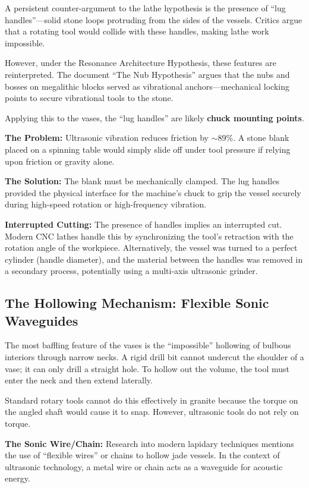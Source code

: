 \documentclass[11pt]{article}
\begin{document}
A persistent counter-argument to the lathe hypothesis is the presence of ``lug handles''---solid stone loops protruding from the sides of the vessels. Critics argue that a rotating tool would collide with these handles, making lathe work impossible.

However, under the Resonance Architecture Hypothesis, these features are reinterpreted. The document ``The Nub Hypothesis'' argues that the nubs and bosses on megalithic blocks served as vibrational anchors---mechanical locking points to secure vibrational tools to the stone.

Applying this to the vases, the ``lug handles'' are likely \textbf{chuck mounting points}.

\textbf{The Problem:} Ultrasonic vibration reduces friction by $\sim$89\%. A stone blank placed on a spinning table would simply slide off under tool pressure if relying upon friction or gravity alone.

\textbf{The Solution:} The blank must be mechanically clamped. The lug handles provided the physical interface for the machine's chuck to grip the vessel securely during high-speed rotation or high-frequency vibration.

\textbf{Interrupted Cutting:} The presence of handles implies an interrupted cut. Modern CNC lathes handle this by synchronizing the tool's retraction with the rotation angle of the workpiece. Alternatively, the vessel was turned to a perfect cylinder (handle diameter), and the material between the handles was removed in a secondary process, potentially using a multi-axis ultrasonic grinder.

\subsection{The Hollowing Mechanism: Flexible Sonic Waveguides}

The most baffling feature of the vases is the ``impossible'' hollowing of bulbous interiors through narrow necks. A rigid drill bit cannot undercut the shoulder of a vase; it can only drill a straight hole. To hollow out the volume, the tool must enter the neck and then extend laterally.

Standard rotary tools cannot do this effectively in granite because the torque on the angled shaft would cause it to snap. However, ultrasonic tools do not rely on torque.

\textbf{The Sonic Wire/Chain:} Research into modern lapidary techniques mentions the use of ``flexible wires'' or chains to hollow jade vessels. In the context of ultrasonic technology, a metal wire or chain acts as a waveguide for acoustic energy.
\end{document}
